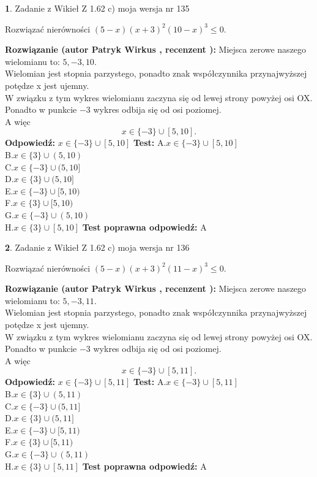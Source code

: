 \documentclass[12pt, a4paper]{article}
\theoremstyle{definition} %
\newtheorem{zad}{}
\newcommand{\zadStart}[1]{\begin{zad}#1\newline}
\newcommand{\zadStop}{\end{zad}}
\newcommand{\rozwStart}[2]{\noindent \textbf{Rozwiązanie (autor #1 , recenzent #2): }\newline}
\newcommand{\rozwStop}{\newline}
\newcommand{\odpStart}{\noindent \textbf{Odpowiedź:}\newline}
\newcommand{\odpStop}{\newline}
\newcommand{\testStart}{\noindent \textbf{Test:}\newline}
\newcommand{\testStop}{\newline}
\newcommand{\kluczStart}{\noindent \textbf{Test poprawna odpowiedź:}\newline}
\newcommand{\kluczStop}{\newline}
\begin{document}
\zadStart{Zadanie z Wikieł Z 1.62 c) moja wersja nr 135}

Rozwiązać nierówności $(5-x)(x+3)^{2}(10-x)^{3}\le0$.
\zadStop
\rozwStart{Patryk Wirkus}{}
Miejsca zerowe naszego wielomianu to: $5, -3, 10$.\\
Wielomian jest stopnia parzystego, ponadto znak współczynnika przy\linebreak najwyższej potędze x jest ujemny.\\ W związku z tym wykres wielomianu zaczyna się od lewej strony powyżej osi OX.\\
Ponadto w punkcie $-3$ wykres odbija się od osi poziomej.\\
A więc $$x \in \{-3\} \cup [5,10].$$
\rozwStop
\odpStart
$x \in \{-3\} \cup [5,10]$
\odpStop
\testStart
A.$x \in \{-3\} \cup [5,10]$\\
B.$x \in \{3\} \cup (5,10)$\\
C.$x \in \{-3\} \cup (5,10]$\\
D.$x \in \{3\} \cup (5,10]$\\
E.$x \in \{-3\} \cup [5,10)$\\
F.$x \in \{3\} \cup [5,10)$\\
G.$x \in \{-3\} \cup (5,10)$\\
H.$x \in \{3\} \cup [5,10]$
\testStop
\kluczStart
A
\kluczStop



\zadStart{Zadanie z Wikieł Z 1.62 c) moja wersja nr 136}

Rozwiązać nierówności $(5-x)(x+3)^{2}(11-x)^{3}\le0$.
\zadStop
\rozwStart{Patryk Wirkus}{}
Miejsca zerowe naszego wielomianu to: $5, -3, 11$.\\
Wielomian jest stopnia parzystego, ponadto znak współczynnika przy\linebreak najwyższej potędze x jest ujemny.\\ W związku z tym wykres wielomianu zaczyna się od lewej strony powyżej osi OX.\\
Ponadto w punkcie $-3$ wykres odbija się od osi poziomej.\\
A więc $$x \in \{-3\} \cup [5,11].$$
\rozwStop
\odpStart
$x \in \{-3\} \cup [5,11]$
\odpStop
\testStart
A.$x \in \{-3\} \cup [5,11]$\\
B.$x \in \{3\} \cup (5,11)$\\
C.$x \in \{-3\} \cup (5,11]$\\
D.$x \in \{3\} \cup (5,11]$\\
E.$x \in \{-3\} \cup [5,11)$\\
F.$x \in \{3\} \cup [5,11)$\\
G.$x \in \{-3\} \cup (5,11)$\\
H.$x \in \{3\} \cup [5,11]$
\testStop
\kluczStart
A
\kluczStop
\end{document}

